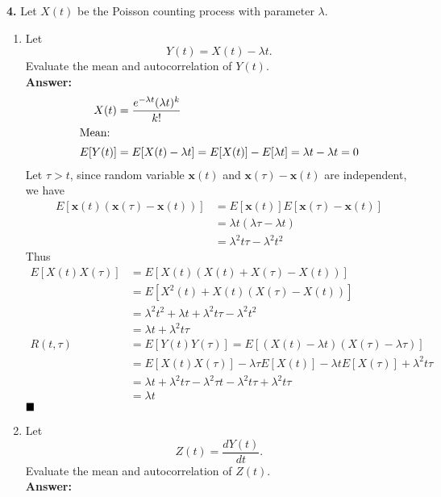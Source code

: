 \textbf{4.} Let $X(t)$ be the Poisson counting process with parameter $\lambda$.
  \begin{enumerate}
  \item Let
    $$ Y(t) = X(t) - \lambda t .$$
    Evaluate the mean and autocorrelation of $Y(t)$.\\
    \textbf{Answer:}\\
    \begin{align*}
      X(t) & = \dfrac{e^{-\lambda t}(\lambda t)^k}{k!}\\
      \shortintertext{Mean:}
      E[Y(t)] & = E[X(t) - \lambda t] = E[X(t)] - E[\lambda t] = \lambda t - \lambda t = 0 \\
    \end{align*}
    Let $\tau > t$, since random variable $\textbf{x}(t)$ and $\textbf{x}(\tau) - \textbf{x}(t)$ are independent, we have
    \begin{align*}
      E[\textbf{x}(t)(\textbf{x}(\tau) - \textbf{x}(t))] & = E[\textbf{x}(t)]E[\textbf{x}(\tau) - \textbf{x}(t)] \\
                                                         & = \lambda t (\lambda \tau - \lambda t) \\
                                                         & = \lambda^2t\tau - \lambda^2t^2
    \end{align*}
    Thus
    \begin{align*}
      E[X(t)X(\tau)] & = E[X(t)(X(t) + X(\tau) - X(t))] \\
                     & = E[X^2(t) + X(t)(X(\tau) - X(t))] \\
                     & = \lambda^2t^2  + \lambda t + \lambda^2t\tau - \lambda^2t^2\\
                     & = \lambda t + \lambda^2t\tau \\
      R(t, \tau) & = E[Y(t)Y(\tau)] = E[(X(t) - \lambda t)(X(\tau) - \lambda \tau)] \\
                     & = E[X(t)X(\tau)] - \lambda \tau E[X(t)] - \lambda t E[X(\tau)] + \lambda^2 t \tau \\
                     & = \lambda t + \lambda^2 t \tau - \lambda^2 \tau t - \lambda^2 t \tau + \lambda^2 t \tau \\
                     & = \lambda t
    \end{align*}
    $\hfill\blacksquare$
  \item Let
    $$Z(t) = \frac{dY(t)}{dt}.$$
    Evaluate the mean and autocorrelation of $Z(t)$.\\
    \textbf{Answer:}\\

\end{enumerate}
